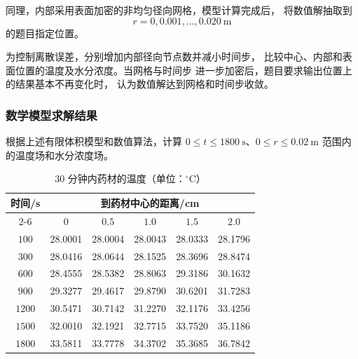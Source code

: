 \documentclass[12pt,a4paper]{article}
\begin{document}
\begin{center}
同理，内部采用表面加密的非均匀径向网格，模型计算完成后，
将数值解抽取到
\begin{equation}
r=0,0.001,\ldots,0.020\ \mathrm{m}
\end{equation}
的题目指定位置。

为控制离散误差，分别增加内部径向节点数并减小时间步，
比较中心、内部和表面位置的温度及水分浓度。当网格与时间步
进一步加密后，题目要求输出位置上的结果基本不再变化时，
认为数值解达到网格和时间步收敛。

\subsubsection{数学模型求解结果}

根据上述有限体积模型和数值算法，计算
$0\le t\le1800\ \mathrm{s}$、$0\le r\le0.02\ \mathrm{m}$
范围内的温度场和水分浓度场。

\begin{table}[H]
\centering
\caption{30 分钟内药材的温度（单位：$^\circ$C）}
\label{tab:t}
\begin{tabular}{cccccc}
\toprule
\multirow{2}{*}{时间/s}
& \multicolumn{5}{c}{到药材中心的距离/cm}\\
\cmidrule(lr){2-6}
& $0$ & $0.5$ & $1.0$ & $1.5$ & $2.0$\\
\midrule
$100$  & 28.0001 & 28.0004 & 28.0043 & 28.0333 & 28.1796\\
$300$  & 28.0416 & 28.0644 & 28.1525 & 28.3696 & 28.8474\\
$600$  & 28.4555 & 28.5382 & 28.8063 & 29.3186 & 30.1632\\
$900$  & 29.3277 & 29.4617 & 29.8790 & 30.6201 & 31.7283\\
$1200$ & 30.5471 & 30.7142 & 31.2270 & 32.1176 & 33.4256\\
$1500$ & 32.0010 & 32.1921 & 32.7715 & 33.7520 & 35.1186\\
$1800$ & 33.5811 & 33.7778 & 34.3702 & 35.3685 & 36.7842\\
\bottomrule
\end{tabular}
\end{table}


\end{center}
\end{document}
